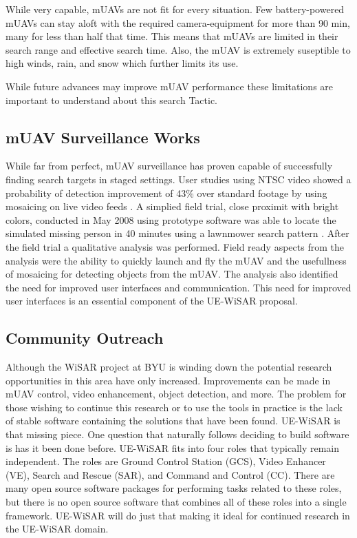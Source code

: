 \documentclass[12pt]{IEEEtran}
\begin{document}
While very capable, mUAVs are not fit for every
situation.  Few battery-powered mUAVs can stay aloft with the required
camera-equipment for more than 90 min, many for less than half that time.  This means that mUAVs are
limited in their search range and effective search time. Also, the mUAV is
extremely suseptible to high winds, rain, and snow which further limits its use.

While future advances may improve mUAV performance
these limitations are important to understand about this search Tactic.

\subsection{mUAV Surveillance Works}
While far from perfect, mUAV surveillance has proven capable of successfully
finding search targets in staged settings.  User studies using NTSC video showed
a probability of detection improvement of 43\% over standard footage by using
mosaicing on live video feeds \cite{goodrich2008supporting}.  A simplied field
trial, close proximit with bright colors, conducted in May 2008 using prototype
software was able to locate the simulated missing person in 40 minutes using a
lawnmower search pattern \cite{goodrich2009towards}.
After the field trial a qualitative analysis was performed.  Field
ready aspects from the analysis were the ability to quickly launch and fly the
mUAV and the usefullness of mosaicing for detecting objects from the mUAV.  The
analysis also identified the need for improved user interfaces and
communication.  This need for improved user interfaces is an essential component
of the UE-WiSAR proposal.

\subsection{Community Outreach}
Although the WiSAR project at BYU is winding down the potential research
opportunities in this area have only increased.  Improvements can be made in
mUAV control, video enhancement, object detection, and more.  The problem for
those wishing to continue this research or to use the tools in practice is the
lack of stable software containing the solutions that have been found.  UE-WiSAR
is that missing piece.  One question that naturally follows deciding to build
software is has it been done before.  UE-WiSAR fits into four roles that
typically remain independent.  The roles are Ground Control Station (GCS), Video
Enhancer (VE), Search and Rescue (SAR), and Command and Control (CC).  There are
many open source software packages for performing tasks related to these roles,
but there is no open source software that combines all of these roles into a
single framework.  UE-WiSAR will do just that making it ideal for continued research in the UE-WiSAR domain.
\end{document}
